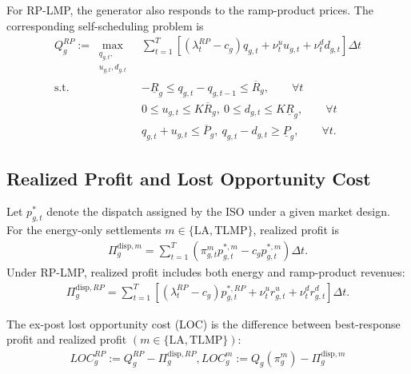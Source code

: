 \documentclass[conference]{IEEEtran}
\begin{document}
For RP-LMP, the generator also responds to the ramp-product prices. The corresponding self-scheduling problem is
\begin{align}
Q_g^{RP}:= \max_{\substack{q_{g,t},\\u_{g,t},d_{g,t}}} 
& \sum_{t=1}^T \left[(\lambda_t^{RP}-c_g) q_{g,t} + \nu_t^{u} u_{g,t} + \nu_t^{d} d_{g,t}\right]\Delta t \label{eq:gen_br_rp_obj}\\
\text{s.t.}\quad
& -\underline R_g \le q_{g,t} - q_{g,t-1} \le \overline R_g, \qquad \forall t \label{eq:gen_br_rp_ramp}\\
& 0 \le u_{g,t} \le K\overline R_g, \ 0 \le d_{g,t} \le K\underline R_g, \qquad \forall t \label{eq:gen_br_rp_prod}\\
& q_{g,t} + u_{g,t} \le \overline P_g, \ q_{g,t} - d_{g,t} \ge \underline P_g, \qquad \forall t. \label{eq:gen_br_rp_head}
\end{align}

\subsection{Realized Profit and Lost Opportunity Cost}
Let $p_{g,t}^{*}$ denote the dispatch assigned by the ISO under a given market design. For the energy-only settlements $m\in\{\mathrm{LA},\mathrm{TLMP}\}$, realized profit is
\begin{align}
\Pi_g^{\mathrm{disp},m} = \sum_{t=1}^T \left( \pi_{g,t}^{m} p_{g,t}^{*,m} - c_g p_{g,t}^{*,m} \right)\Delta t. \label{eq:profit_energy_only}
\end{align}
Under RP-LMP, realized profit includes both energy and ramp-product revenues:
\begin{align}
\Pi_g^{\mathrm{disp},RP} = \sum_{t=1}^T \left[(\lambda_t^{RP}-c_g)p_{g,t}^{*,RP} + \nu_t^{u} r_{g,t}^{u} + \nu_t^{d} r_{g,t}^{d}\right]\Delta t. \label{eq:profit_rp}
\end{align}

The ex-post lost opportunity cost (LOC) is the difference between best-response profit and realized profit $(m \in \{\text{LA}, \text{TLMP}\})$:
\begin{align}
LOC_g^{RP} := Q_g^{RP} - \Pi_g^{\mathrm{disp},RP},
LOC_g^{m} := Q_g(\pi_g^m) - \Pi_g^{\mathrm{disp},m} \label{eq:loc_def}
\end{align}
\end{document}
